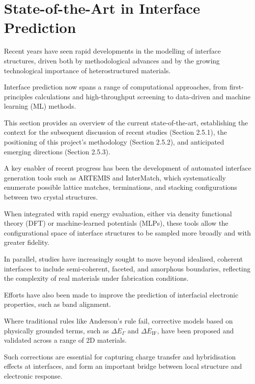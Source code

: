 \section{State-of-the-Art in Interface Prediction} \label{section:state_of_the_art}


Recent years have seen rapid developments in the modelling of interface structures, driven both by methodological
advances and by the growing technological importance of heterostructured materials.

Interface prediction now spans a range of computational approaches, from first-principles calculations and
high-throughput screening to data-driven and machine learning (ML) methods.

This section provides an overview of the current state-of-the-art, establishing the context for the subsequent
discussion of recent studies (Section 2.5.1), the positioning of this project's methodology (Section 2.5.2), and
anticipated emerging directions (Section 2.5.3).


A key enabler of recent progress has been the development of automated interface generation tools such as ARTEMIS and
InterMatch, which systematically enumerate possible lattice matches, terminations, and stacking configurations between
two crystal structures.

When integrated with rapid energy evaluation, either via density functional theory (DFT) or machine-learned potentials
(MLPs), these tools allow the configurational space of interface structures to be sampled more broadly and with greater
fidelity.

In parallel, studies have increasingly sought to move beyond idealised, coherent interfaces to include semi-coherent,
faceted, and amorphous boundaries, reflecting the complexity of real materials under fabrication conditions.


Efforts have also been made to improve the prediction of interfacial electronic properties, such as band alignment.

Where traditional rules like Anderson's rule fail, corrective models based on physically grounded terms, such as
$\Delta E_{\Gamma}$ and $\Delta E_{\mathrm{IF}}$, have been proposed and validated across a range of 2D materials.

Such corrections are essential for capturing charge transfer and hybridisation effects at interfaces, and form an
important bridge between local structure and electronic response.

